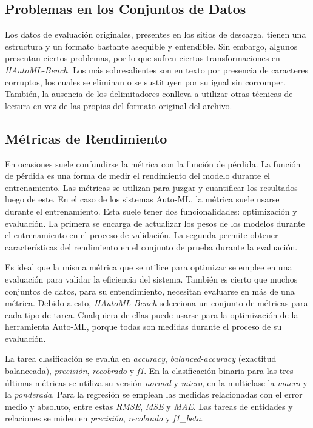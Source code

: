 \subsection{Problemas en los Conjuntos de Datos}\label{subsection:dataproblems}

Los datos de evaluación originales, presentes en los sitios de descarga, tienen una estructura y un formato bastante asequible y entendible. 
Sin embargo, algunos presentan ciertos problemas, por lo que sufren ciertas transformaciones en \textit{HAutoML-Bench}. Los más sobresalientes son en texto por presencia 
de caracteres corruptos, los cuales se eliminan o se sustituyen por su igual sin corromper. También, la ausencia de los delimitadores conlleva a utilizar otras 
técnicas de lectura en vez de las propias del formato original del archivo.

\subsection{Métricas de Rendimiento}\label{subsection:metrics}

En ocasiones suele confundirse la métrica con la función de pérdida. La función de pérdida es una forma de medir el rendimiento del modelo durante el 
entrenamiento. Las métricas se utilizan para juzgar y cuantificar los resultados luego de este. En el caso de los sistemas Auto-ML, la métrica suele usarse 
durante el entrenamiento. Esta suele tener dos funcionalidades: optimización y evaluación. La primera se encarga de actualizar los pesos de los modelos durante el 
entrenamiento en el proceso de validación. La segunda permite obtener características del rendimiento en el conjunto de prueba durante la evaluación.

Es ideal que la misma métrica que se utilice para optimizar se emplee en una evaluación para validar la eficiencia del sistema. También es cierto que muchos conjuntos 
de datos, para su entendimiento, necesitan evaluarse en más de una métrica. Debido a esto, \textit{HAutoML-Bench} selecciona un conjunto de métricas para cada 
tipo de tarea. Cualquiera de ellas puede usarse para la optimización de la herramienta Auto-ML, porque todas son medidas durante el proceso de su evaluación.

La tarea clasificación se evalúa en \textit{accuracy}, \textit{balanced-accuracy} (exactitud balanceada), \textit{precisión}, \textit{recobrado} y 
\textit{f1}. En la clasificación binaria para las tres últimas métricas se utiliza su versión \textit{normal} y \textit{micro}, en la 
multiclase la \textit{macro} y la \textit{ponderada}. Para la regresión se emplean las medidas relacionadas con el error medio y 
absoluto, entre estas \textit{RMSE}, \textit{MSE} y \textit{MAE}. 
Las tareas de entidades y relaciones se miden en \textit{precisión}, \textit{recobrado} y \textit{f1\_beta}.

